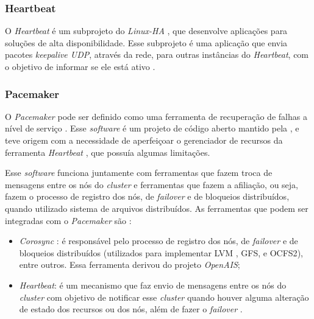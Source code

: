 
\subsubsection{Heartbeat}
\label{section:heartbeat}
O \textit{Heartbeat} é um subprojeto do \textit{Linux-HA} \cite{linuxha}, que desenvolve aplicações para soluções de alta disponibilidade.
Esse subprojeto é uma aplicação que envia pacotes \textit{keepalive \ac{UDP}}, através da rede, para outras instâncias do \textit{Heartbeat}, 
com o objetivo de informar se ele está ativo \cite{reis2009}.

\subsubsection{Pacemaker}
\label{section:pacemaker}
O \textit{Pacemaker} \cite{pacemaker} pode ser definido como uma ferramenta de recuperação de falhas a nível de serviço \cite{perkov2011}. 
Esse \textit{software} é um projeto de código aberto mantido pela \cite{clusterlabs}, e teve origem com a necessidade de aperfeiçoar o gerenciador 
de recursos da ferramenta \textit{Heartbeat} \cite{heartbeat}, que possuía algumas limitações. 

Esse \textit{software} funciona juntamente com ferramentas que fazem troca de mensagens entre os nós do \textit{cluster} e ferramentas que 
fazem a afiliação, ou seja, fazem o processo de registro dos nós, de \textit{failover} e de bloqueios distribuídos, quando utilizado sistema 
de arquivos distribuídos. As ferramentas que podem ser integradas com o \textit{Pacemaker} são \cite{pacemaker}:
\begin{itemize}
 \item \textit{Corosync} \cite{corosync}: é responsável pelo processo de registro dos nós, de \textit{failover} e de bloqueios distribuídos 
 (utilizados para implementar \ac{LVM} \cite{lvm}, \ac{GFS}, e \ac{OCFS2}), entre outros. Essa ferramenta derivou do projeto \textit{OpenAIS};
 \item \textit{Heartbeat}: é um mecanismo que faz envio de mensagens entre os nós do \textit{cluster} com objetivo de notificar esse 
 \textit{cluster} quando houver alguma alteração de estado dos recursos ou dos nós, além de fazer o \textit{failover} \cite{clusterlabs}.
\end{itemize}


